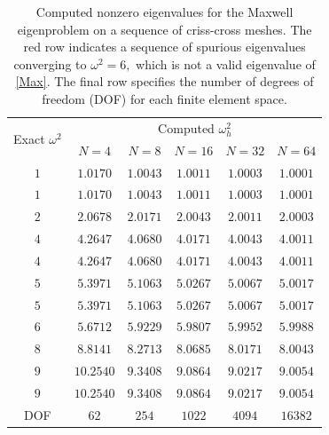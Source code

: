 

\begin{table}[ht]
\centering
\begin{tabular}{c|ccccc}
\toprule
\multirow{2}{*}{Exact $\omega^2$}
&
\multicolumn{5}{c}{Computed $\omega_h^2$}
\\
&
$N=4$
&
$N=8$
&
$N=16$
&
$N=32$
&
$N=64$
\\
\midrule
$1$
&
$1.0170$
&
$1.0043$
&
$1.0011$
&
$1.0003$
&
$1.0001$
\\
$1$
&
$1.0170$
&
$1.0043$
&
$1.0011$
&
$1.0003$
&
$1.0001$
\\
$2$
&
$2.0678$
&
$2.0171$
&
$2.0043$
&
$2.0011$
&
$2.0003$
\\
$4$
&
$4.2647$
&
$4.0680$
&
$4.0171$
&
$4.0043$
&
$4.0011$
\\
$4$
&
$4.2647$
&
$4.0680$
&
$4.0171$
&
$4.0043$
&
$4.0011$
\\
$5$
&
$5.3971$
&
$5.1063$
&
$5.0267$
&
$5.0067$
&
$5.0017$
\\
$5$
&
$5.3971$
&
$5.1063$
&
$5.0267$
&
$5.0067$
&
$5.0017$
\\
\textcolor{seabornred}{$6$}
&
\textcolor{seabornred}{$5.6712$}
&
\textcolor{seabornred}{$5.9229$}
&
\textcolor{seabornred}{$5.9807$}
&
\textcolor{seabornred}{$5.9952$}
&
\textcolor{seabornred}{$5.9988$}
\\
$8$
&
$8.8141$
&
$8.2713$
&
$8.0685$
&
$8.0171$
&
$8.0043$
\\
$9$
&
$10.2540$
&
$9.3408$
&
$9.0864$
&
$9.0217$
&
$9.0054$
\\
$9$
&
$10.2540$
&
$9.3408$
&
$9.0864$
&
$9.0217$
&
$9.0054$
\\
\midrule
DOF
&
$62$
&
$254$
&
$1022$
&
$4094$
&
$16382$
\\
\bottomrule
\end{tabular}
\caption[Spectral Pollution and the Maxwell Eigenproblem]{Computed nonzero eigenvalues for the Maxwell eigenproblem on a sequence of criss-cross meshes. The red row indicates a sequence of spurious eigenvalues converging to $\omega^2=6,$ which is not a valid eigenvalue of \eqref{Max}. The final row specifies the number of degrees of freedom (DOF) for each finite element space.}
\label{spect pollute}
\end{table}



